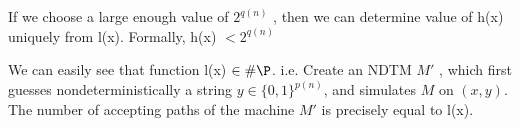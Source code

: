 If we choose a large enough value of $2^{q(n)}$ , then we can determine value of h(x) uniquely from l(x). Formally, 
 h(x) $< 2^{q(n)}$ \newline
 
 We can easily see that function l(x) $\in \#\P$. i.e. Create an NDTM $M'$ , which first guesses nondeterministically a string $y \in \{0,1\}^{p(n)}$,
 and simulates $M$ on $(x,y)$. The number of accepting paths of the machine $M'$ is precisely equal to l(x).


\begin{comment}
\begin{lemma}
\label{lemma1} If $\mathcal{A}\in \parity\P$ then $\exists B$ such
that for any polynomial $q$ and input $x$ of length $n$,
$$x\in \mathcal{A}\Rightarrow (\#(x,y)\in B)\equiv -1 \mod 2^{q(n)}$$
$$x\notin \mathcal{A}\Rightarrow (\#(x,y)\in B)\equiv 0 \mod 2^{q(n)}$$

Now we can state the lemma as, Let $\mathcal{A}\in \parity\P$. Then
for any polynomial $q$, there exists a polynomial-time NTM M such that
for any input $x$ of length $n$,
$$x\in \mathcal{A}\Rightarrow (\chi_M(x))\equiv -1\mod 2^{q(n)}$$
$$x\notin \mathcal{A}\Rightarrow (\chi_M(x))\equiv 0 \mod 2^{q(n)}$$
Here $\chi_M(x)$ denotes the number of accepting computations of $M$
on $x$.
\end{lemma}
\begin{proof} Let $M_1$ be a polynomial time NTM such that
$$\chi_{M_1}\equiv 1\mod 2\mbox{ if } x\in \mathcal{A}$$ %
$$\chi_{M_1}\equiv 0\mod 2 \mbox{ if }x\notin \mathcal{A}$$ 

In other words,
$$x\in \mathcal{A}\Rightarrow (\#acc_M(x)) \mbox{ is odd}$$
$$x\notin \mathcal{A}\Rightarrow (\#acc_M(x))\mbox{ is even}$$


Define another polynomial time NTM $M_2$ that repeats $M_1$ on $x$ a
number of times such that
$$x\in \mathcal{A}\Rightarrow (\#acc_{M_2}(x)) \mbox{ is odd}$$
$$x\notin \mathcal{A}\Rightarrow (\#acc_{M_2}(x))\mbox{ is even}$$

Note: Given two NDTMs $M_1$ and $M_2$, we know how to get an $M_3$
with:
\begin{itemize}
\item $\#acc_{M_3}(x)=\#acc_{M_1}(x)+\#acc_{M_2}(x) $: By running
$M_1$ and $M_2$ in parallel.
\item $\#acc_{M_3}(x)=\#acc_{M_1}(x)\times\#acc_{M_2}(x) $: By rnning
$M_1$ and $M_2$ one after other.
\end{itemize}

Let $f(x,i)=\chi_{M_2}(<x,i>)$. It if clear that $f$ satisfies the
recurrence relation given below:
\begin{eqnarray}
\label{rec} f(x,i+1)=3f(x,i)^4+4f(x,i)^3, i\geq0
\end{eqnarray} From equation ~\ref{rec}
$$f(x,0)\mbox{ is even }\Rightarrow f(x,i)\equiv 0\mod 2^{2^i}$$
$$f(x,0)\mbox{ is odd }\Rightarrow f(x,i)\equiv -1\mod 2^{2^i}$$
Now from the above analysis,
$$x\in \mathcal{A}\Rightarrow (\chi_M(x)\equiv  -1\mod 2^{2^{\log q(n)}}\equiv -1\mod 2^{q(n)}$$
$$x\notin \mathcal{A}\Rightarrow (\chi_M(x)\equiv  0\mod 2^{2^{\log q(n)}}\equiv 0\mod 2^{q(n)}$$
\end{proof}



\end{comment}
